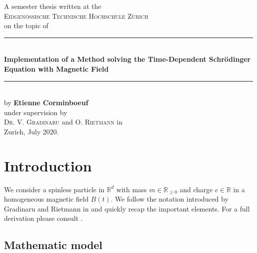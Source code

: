 \documentclass[11pt, a4paper, oneside]{article}
\begin{document}


\thispagestyle{empty}

\begin{center}
  A semester thesis written at the
  \\
  \textsc{Eidgen\"ossische Technische Hochschule Z\"urich}
  \\
  on the topic of
  \\[0.5cm]
  \rule{\linewidth}{0.5mm}
  \\[0.4cm]
  \Large
  \textbf{Implementation of a Method solving the Time-Dependent Schr{\"o}dinger Equation with Magnetic Field}
  \normalsize
  \\[0.1cm]
  \rule{\linewidth}{0.5mm}
  \\[0.5cm]
  by \textbf{Etienne Corminboeuf}
  \\
  under supervision by
  \\
  \textsc{Dr. V. Gradinaru} and \textsc{O. Rietmann} in
  \\
  Zurich, July 2020.
  \\[1.0cm]
\end{center}

\newpage

\tableofcontents

\newpage

\section{Introduction} \label{sec:intro}
We consider a spinless particle in $\mathbb{R}^d$ with mass $m \in \mathbb{R}_{\geq 0}$ and charge $e\in \mathbb{R}$ in a homogeneous magnetic field $B(t)$. We follow the notation introduced by Gradinaru and Rietmann in  and quickly recap the important elements. For a full derivation please consult .
\subsection{Mathematic model}
\end{document}
